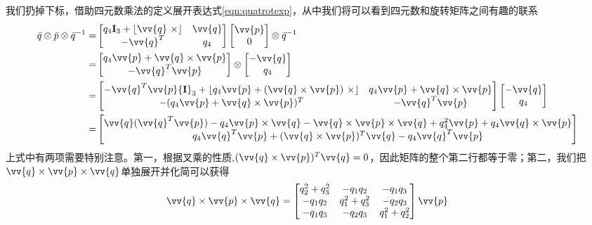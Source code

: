 \documentclass[11pt]{article}
\begin{document}
我们扔掉下标，借助四元数乘法的定义展开表达式\ref{eqn:quatrotexp}，从中我们将可以看到四元数和旋转矩阵之间有趣的联系
\begin{align*}
\bar{q} \otimes \bar{p} \otimes \bar{q}^{-1} 
= & 
\begin{bmatrix}
q_4\mathbf{I}_3+\lfloor \vv{q} \ \times \rfloor   & \vv{q} \\
-\vv{q}^T & q_4  
\end{bmatrix} 
\begin{bmatrix}
\vv{p}\\
0
\end{bmatrix}\otimes \bar{q}^{-1}
\\
= &
\begin{bmatrix}
q_4\vv{p} + \vv{q}\times\vv{p} \\
-\vv{q}^T\vv{p}
\end{bmatrix}
\otimes
\begin{bmatrix}
-\vv{q}\\
q_4
\end{bmatrix}
\\
= &
\begin{bmatrix}
-\vv{q}^T\vv{p}{\bf I}_3 + \lfloor q_4\vv{p}+(\vv{q}\times\vv{p}) \ \times \rfloor &
q_4\vv{p} + \vv{q}\times\vv{p} \\
-(q_4\vv{p}+\vv{q}\times\vv{p})^T &
-\vv{q}^T\vv{p}
\end{bmatrix}
\begin{bmatrix}
-\vv{q}\\
q_4
\end{bmatrix}
\\
= &
\begin{bmatrix}
\vv{q}(\vv{q}^T\vv{p}) - q_4\vv{p}\times\vv{q} - \vv{q}\times\vv{p}\times\vv{q}+q_4^2\vv{p}+q_4\vv{q}\times\vv{p}\\
q_4\vv{q}^T\vv{p}+(\vv{q}\times\vv{p})^T\vv{q}-q_4\vv{q}^T\vv{p}
\end{bmatrix}
\end{align*}
上式中有两项需要特别注意。第一，根据叉乘的性质,$(\vv{q}\times\vv{p})^T\vv{q} = 0$，因此矩阵的整个第二行都等于零；第二，我们把$\vv{q}\times\vv{p}\times\vv{q}$单独展开并化简可以获得
\begin{equation}\label{eqn:crosscross}
\vv{q}\times\vv{p}\times\vv{q} = 
\begin{bmatrix}
q_2^2+q_3^2	&	-q_1q_2		&	-q_1q_3	\\
-q_1q_2		&	q_1^2+q_3^2	&	-q_2q_3	\\
-q_1q_3		&	-q_2q_3		&	q_1^2+q_2^2
\end{bmatrix}\vv{p}
\end{equation}
\end{document}
